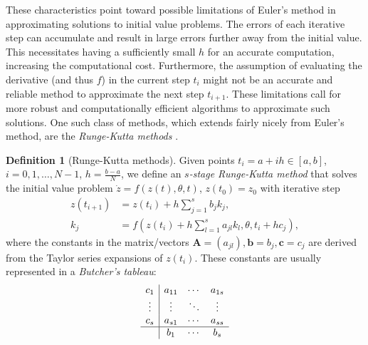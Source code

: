 \documentclass[a4paper,11pt,titlepage]{article}
\theoremstyle{definition}
\newtheorem{definition}{Definition}[section]
\theoremstyle{plain}
\theoremstyle{remark}
\begin{document}
These characteristics point toward possible limitations of Euler's method in approximating solutions to initial value problems. The errors of each iterative step can accumulate and result in large errors further away from the initial value. This necessitates having a sufficiently small $h$ for an accurate computation, increasing the computational cost. Furthermore, the assumption of evaluating the derivative (and thus $f$) in the current step $t_i$ might not be an accurate and reliable method to approximate the next step $t_{i+1}$. These limitations call for more robust and computationally efficient algorithms to approximate such solutions. One such class of methods, which extends fairly nicely from Euler's method, are the \textit{Runge-Kutta methods} \cite{sulimayers2003}.

\begin{definition}[Runge-Kutta methods]
    Given points $t_i = a + ih \in \left[a, b\right]$, $i = 0, 1, \dots, N - 1$, $h = \frac{b-a}{N}$, we define an $s$\textit{-stage Runge-Kutta method} that solves the initial value problem $\dot{z}= f(z(t), \theta,t)$, $z(t_0) = z_0$ with iterative step
    \begin{align*}
        z(t_{i+1}) &= z(t_i) + h\sum_{j=1}^s b_j k_j, \\
        k_j &= f\left(z(t_i) + h\sum_{l=1}^s a_{jl}k_l, \theta, t_i + hc_j\right),
    \end{align*}
    where the constants in the matrix/vectors $\mathbf{A} = (a_{jl}), \mathbf{b} = b_j, \mathbf{c} = c_j$ are derived from the Taylor series expansions of $z(t_i)$. These constants are usually represented in a \textit{Butcher's tableau}:
    \begin{equation*}
        \begin{array}{c|ccc}
            c_1 & a_{11} & \cdots & a_{1s} \\
            \vdots & \vdots & \ddots & \vdots  \\
            c_s & a_{s1} & \cdots & a_{ss} \\
            \hline
            & b_1 & \cdots & b_s
        \end{array}
    \end{equation*}
\end{definition}
\end{document}

